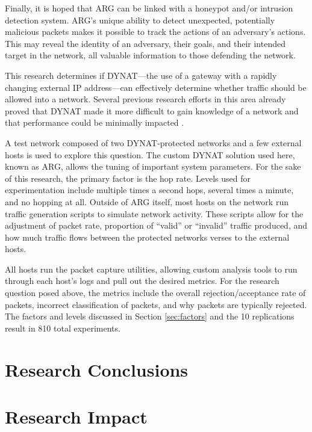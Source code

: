 \par Finally, it is hoped that ARG can be linked with a honeypot and/or intrusion detection system. ARG's unique ability to detect unexpected, potentially malicious packets makes it possible to track the actions of an adversary's actions. This may reveal the identity of an adversary, their goals, and their intended target in the network, all valuable information to those defending the network.

\par This research determines if \ac{DYNAT}---the use of a gateway with a rapidly changing external \ac{IP} address---can effectively determine whether traffic should be allowed into a network. Several previous research efforts in this area already proved that \ac{DYNAT} made it more difficult to gain knowledge of a network \cite{BBNDYNAT} and that performance could be minimally impacted \cite{NAH}. 

\par A test network composed of two \ac{DYNAT}-protected networks and a few external hosts is used to explore this question. The custom \ac{DYNAT} solution used here, known as \ac{ARG}, allows the tuning of important system parameters. For the sake of this research, the primary factor is the hop rate. Levels used for experimentation include multiple times a second hops, several times a minute, and no hopping at all. Outside of \ac{ARG} itself, most hosts on the network run traffic generation scripts to simulate network activity. These scripts allow for the adjustment of packet rate, proportion of ``valid'' or ``invalid'' traffic produced, and how much traffic flows between the protected networks verses to the external hosts.

\par All hosts run the packet capture utilities, allowing custom analysis tools to run through each host's logs and pull out the desired metrics. For the research question posed above, the metrics include the overall rejection/acceptance rate of packets, incorrect classification of packets, and why packets are typically rejected. The factors and levels discussed in Section \ref{sec:factors} and the 10 replications result in 810 total experiments.

\section{Research Conclusions}

\section{Research Impact}

